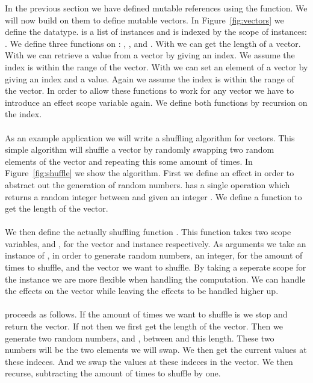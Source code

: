 In the previous section we have defined mutable references using the  function.
We will now build on them to define mutable vectors.
In Figure~\ref{fig:vectors} we define the  datatype.
 is a list of  instances and is indexed by the scope of instances: .
We define three functions on : , , and .
With  we can get the length of a vector.
With  we can retrieve a value from a vector by giving an index.
We assume the index is within the range of the vector.
With  we can set an element of a vector by giving an index and a value.
Again we assume the index is within the range of the vector.
In order to allow these functions to work for any vector we have to introduce an effect scope variable  again.
We define both functions by recursion on the index.
\\\\
As an example application we will write a shuffling algorithm for vectors.
This simple algorithm will shuffle a vector by randomly swapping two random elements of the vector and repeating this some amount of times.
In Figure~\ref{fig:shuffle} we show the algorithm.
First we define an effect  in order to abstract out the generation of random numbers.
 has a single operation  which returns a random integer between  and  given an integer .
We define a function  to get the length of the vector.
\\\\
We then define the actually shuffling function .
This function takes two scope variables,  and , for the vector and  instance respectively.
As arguments we take an instance of , in order to generate random numbers, an integer, for the amount of times to shuffle, and the vector we want to shuffle.
By taking a seperate scope for the  instance we are more flexible when handling the computation.
We can handle the effects on the vector while leaving the  effects to be handled higher up.
\\\\
 proceeds as follows.
If the amount of times we want to shuffle is  we stop and return the vector.
If not then we first get the length of the vector.
Then we generate two random numbers,  and , between  and this length.
These two numbers will be the two elements we will swap.
We then get the current values at these indeces.
And we swap the values at these indeces in the vector.
We then recurse, subtracting the amount of times to shuffle by one.

